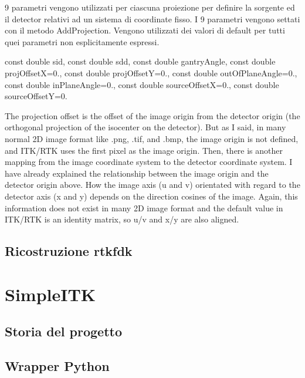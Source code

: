 \documentclass[a4paper,12pt, doubleside]{report}
\begin{document}
                    9 parametri vengono utilizzati per ciascuna proiezione per definire la sorgente ed il detector relativi ad un sistema di coordinate fisso. I 9 parametri vengono settati con il metodo AddProjection. Vengono utilizzati dei valori di default per tutti quei parametri non esplicitamente espressi.
                        
                    const double sid, const double sdd, const double gantryAngle, const double projOffsetX=0., const double projOffsetY=0., const double outOfPlaneAngle=0., const double inPlaneAngle=0., const double sourceOffsetX=0., const double sourceOffsetY=0.
                        
                    The projection offset is the offset of the image origin from the
                    detector origin (the orthogonal projection of the isocenter on the
                    detector). But as I said, in many normal 2D image
                    format like .png, .tif, and .bmp, the image origin is not defined, and
                    ITK/RTK uses the first pixel as the image origin.
                    Then, there is another mapping from the image coordinate system to the
                    detector coordinate system. I have already explained the relationship
                    between the image origin and the detector origin above. How the image
                    axis (u and v) orientated with regard to the detector axis (x and y)
                    depends on the direction cosines of the image. Again, this information
                    does not exist in many 2D image format and the default value in
                    ITK/RTK is an identity matrix, so u/v and x/y are also aligned.\cite{rtk-users-proj-offset}
                
            \subsection{Ricostruzione rtkfdk}

        \section{SimpleITK}
            \subsection{Storia del progetto}
            \subsection{Wrapper Python}
                
\end{document}
